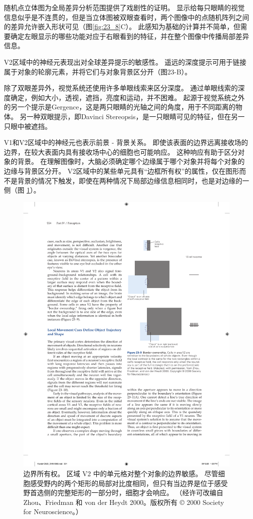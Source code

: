 随机点立体图为全局差异分析范围提供了戏剧性的证明。 
显示给每只眼睛的视觉信息似乎是不连贯的，但是当立体图被双眼查看时，两个图像中的点随机阵列之间的差异允许嵌入形状可见（图\ref{fig:23_8}C）。 
此感知为基础的计算并不简单，但需要确定左眼显示的哪些功能对应于右眼看到的特征，并在整个图像中传播局部差异信息。


V2区域中的神经元表现出对全球差异提示的敏感性。 
遥远的深度提示可用于链接属于对象的轮廓元素，并将它们与对象背景区分开（图23-B）。


除了双眼差异外，视觉系统还使用许多单眼线索来区分深度。 
通过单眼线索的深度确定，例如大小，透视，遮挡，亮度和运动，并不困难。 
起源于视觉系统之外的另一个提示是Gergence，这是两只眼睛的光轴之间的角度，用于不同距离的物体。 
另一种双眼提示，即Davinci Stereopsis，是一只眼睛可见的特征，但在另一只眼中被遮挡。


V1和V2区域中的神经元也表示前景 - 背景关系。 
即使该表面的边界远离接收场的边界，在较大表面内具有接收场中心的细胞也可能响应。 
这种响应有助于区分对象的背景。 
在理解图像时，大脑必须确定哪个边缘属于哪个对象并将每个对象的边缘与背景区分开。 V2区域中的某些单元具有“边框所有权”的属性，仅在图形而不是背景的情况下触发，即使在两种情况下局部边缘信息相同时，也是对边缘的一侧（图 \ref{fig:23_9}）。


\begin{figure}[htbp]
	\centering
	\includegraphics[width=0.5\linewidth]{chap23/fig_23_9}
	\caption{边界所有权。 区域 V2 中的单元格对整个对象的边界敏感。 尽管细胞感受野内的两个矩形的局部对比度相同，但只有当边界是位于感受野首选侧的完整矩形的一部分时，细胞才会响应。 （经许可改编自 Zhou、Friedman 和 von der Heydt 2000。版权所有 © 2000 Society for Neuroscience。）}
	\label{fig:23_9}
\end{figure}




